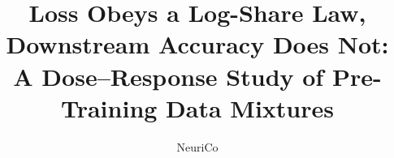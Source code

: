 \documentclass{article}
\title{Loss Obeys a Log-Share Law, Downstream Accuracy Does Not:\\ A Dose--Response Study of Pre-Training Data Mixtures}
\author{NeuriCo}
\begin{document}
\maketitle

\begin{abstract}

\end{abstract}










\appendix

\end{document}
